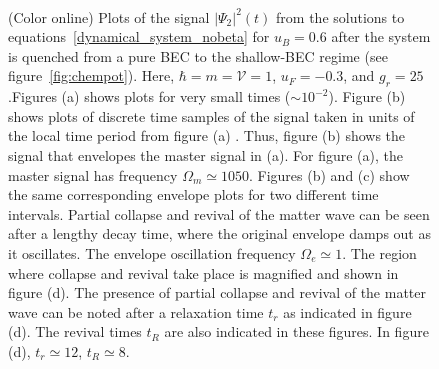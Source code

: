 \documentclass[a4paper,10pt]{article}
\begin{document}
\begin{figure}[h!bt]
\hspace*{-0.3in}
\ 
\caption{(Color online) Plots of the signal $|\Psi_2|^2(t)$  from the solutions to equations~\ref{dynamical_system_nobeta} for $u_B = 0.6$ after the system is quenched from a pure BEC to the shallow-BEC regime (see figure~\ref{fig:chempot}). Here, $\hbar = m =\mathcal{V} = 1$, $u_F = -0.3$, and $g_r = 25$.Figures (a) shows plots for very small times ($\sim 10^{-2}$). Figure (b) shows plots of discrete time samples of the signal taken in units of the local time period from figure (a) . Thus, figure (b) shows the signal that envelopes the master signal in (a). For figure (a), the master signal has frequency $\Omega_m \simeq 1050$. Figures (b) and (c) show the same corresponding envelope plots for two different time intervals. Partial collapse and revival of the matter wave can be seen after a lengthy decay time, where the original envelope damps out as it oscillates. The envelope oscillation frequency $\Omega_e \simeq 1$. The region where collapse and revival take place is magnified and shown in figure (d). The presence of partial collapse and revival of the matter wave can be noted after a relaxation time $t_r$ as indicated in figure (d). The revival times $t_R$ are also indicated in these figures. In figure (d), $t_r\simeq 12$, $t_R\simeq 8$.}
\label{fig:colrev2}
\end{figure}
\pagebreak
\end{document}

